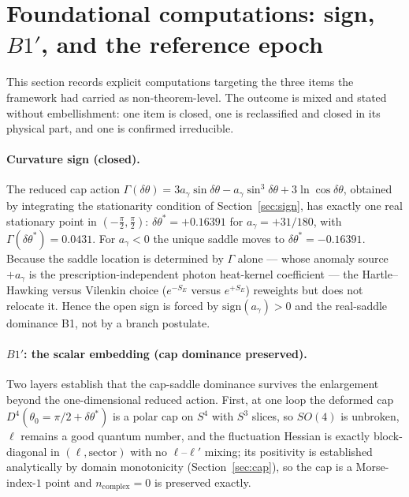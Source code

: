 \documentclass[11pt,a4paper]{article}
\theoremstyle{plain}
\theoremstyle{definition}
\theoremstyle{remark}
\newcommand{\ag}{a_\gamma}
\newcommand{\dtheta}{\delta\theta}
\begin{document}
\section{Foundational computations: sign, $B1'$, and the reference epoch}
\label{sec:found}
This section records explicit computations targeting the three items the framework had carried
as non-theorem-level. The outcome is
mixed and stated without embellishment: one item is closed, one is reclassified and closed in its
physical part, and one is confirmed irreducible.

\paragraph{Curvature sign (closed).} The reduced cap action $\Gamma(\dtheta) = 3\ag\sin\dtheta -
\ag\sin^3\dtheta + 3\ln\cos\dtheta$, obtained by integrating the stationarity condition of
Section~\ref{sec:sign}, has exactly one real stationary point in $(-\tfrac\pi2,\tfrac\pi2)$:
$\dtheta^* = +0.16391$ for $\ag = +31/180$, with $\Gamma(\dtheta^*) = 0.0431$. For $\ag<0$ the
unique saddle moves to $\dtheta^* = -0.16391$. Because the saddle location is determined by
$\Gamma$ alone --- whose anomaly source $+\ag$ is the prescription-independent photon
heat-kernel coefficient --- the Hartle--Hawking versus Vilenkin choice ($e^{-S_E}$ versus
$e^{+S_E}$) reweights but does not relocate it. Hence the open sign is forced by
$\mathrm{sign}(\ag)>0$ and the real-saddle dominance B1, not by a branch postulate.

\paragraph{$B1'$: the scalar embedding (cap dominance preserved).} Two layers establish that the
cap-saddle dominance survives the enlargement beyond the one-dimensional reduced action. First,
at one loop the deformed cap $D^4(\theta_0=\pi/2+\dtheta^*)$ is a polar cap on $S^4$ with $S^3$
slices, so $SO(4)$ is unbroken, $\ell$ remains a good quantum number, and the fluctuation Hessian
is exactly block-diagonal in $(\ell,\text{sector})$ with no $\ell$--$\ell'$ mixing; its positivity
is established analytically by domain monotonicity (Section~\ref{sec:cap}), so the cap is a
Morse-index-$1$ point and $n_{\mathrm{complex}}=0$ is preserved exactly.
\end{document}
